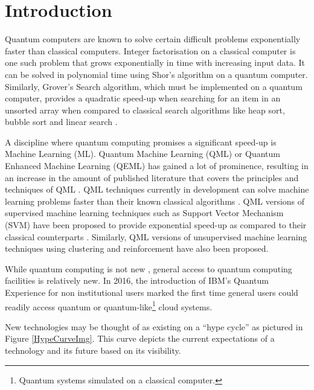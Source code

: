 \chapter{Introduction}

Quantum computers are known to solve certain difficult problems exponentially faster than classical computers. Integer factorisation on a classical computer is one such problem that grows exponentially in time with increasing input data. It can be solved in polynomial time using Shor’s algorithm \citep{Intro1} on a quantum computer. Similarly, Grover’s Search algorithm, which must be implemented on a quantum computer, provides a quadratic speed-up when searching for an item in an unsorted array when compared to classical search algorithms like heap sort, bubble sort and linear search \citep{Gebhart_2021}.

A discipline where quantum computing promises a significant speed-up is Machine Learning (ML). Quantum Machine Learning (QML) or Quantum Enhanced Machine Learning (QEML) has gained a lot of prominence, resulting in an increase in the amount of published literature that covers the principles and techniques of QML \citep{Schuld_2014In5}. QML techniques currently in development can solve machine learning problems faster than their known classical algorithms \citep{Khan2019}. QML versions of supervised machine learning techniques such as Support Vector Mechanism (SVM) have been proposed to provide exponential speed-up as compared to their classical counterparts \citep{Abbott_2010}. Similarly, QML versions of unsupervised machine learning techniques using clustering and reinforcement have also been proposed.


While quantum computing is not new \citep{britannicaQauntum}, general access to quantum computing facilities is relatively new. In 2016, the introduction of IBM's Quantum Experience \citep{IBMStartYear} for non institutional users marked the first time general users could readily access quantum or quantum-like\footnote{Quantum systems simulated on a classical computer.} cloud systems.

New technologies may be thought of as existing on a “hype cycle” as pictured in Figure \ref{HypeCurveImg}. This curve depicts the current expectations of a technology and its future based on its visibility.
 

